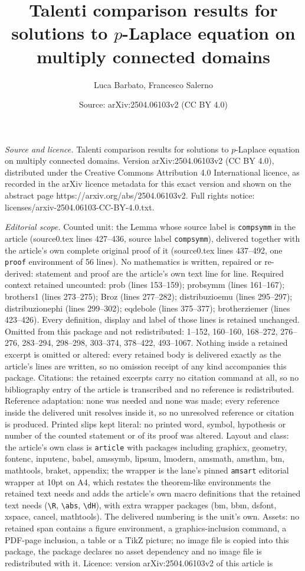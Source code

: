 \documentclass[10pt,a4paper]{amsart}
\title[Talenti comparison results for solutions to $p$-Laplace equa]{Talenti comparison results for solutions to $p$-Laplace equation on multiply connected domains}
\author{Luca Barbato, Francesco Salerno}
\date{Source: arXiv:2504.06103v2 (CC BY 4.0)}
\begin{document}
\maketitle

\noindent\emph{Source and licence.} Talenti comparison results for solutions to $p$-Laplace equation on multiply connected domains. Version arXiv:2504.06103v2 (CC BY 4.0), distributed under the Creative Commons Attribution 4.0 International licence, as recorded in the arXiv licence metadata for this exact version and shown on the abstract page https://arxiv.org/abs/2504.06103v2. Full rights notice: licenses/arxiv-2504.06103-CC-BY-4.0.txt.\par\smallskip

\noindent\textit{Editorial scope.} Counted unit: the Lemma whose source label is \texttt{compsymm} in the article (source0.tex lines 427--436, source label \texttt{compsymm}), delivered together with the article's own complete original proof of it (source0.tex lines 437--492, one \texttt{proof} environment of 56 lines). No mathematics is written, repaired or re-derived: statement and proof are the article's own text line for line. Required context retained uncounted: prob (lines 153--159); probsymm (lines 161--167); brothers1 (lines 273--275); Broz (lines 277--282); distribuzioemu (lines 295--297); distribuzionephi (lines 299--302); eqdebole (lines 375--377); brotherziemer (lines 423--426). Every definition, display and label of those lines is retained unchanged. Omitted from this package and not redistributed: 1--152, 160--160, 168--272, 276--276, 283--294, 298--298, 303--374, 378--422, 493--1067. Nothing inside a retained excerpt is omitted or altered: every retained body is delivered exactly as the article's lines are written, so no omission receipt of any kind accompanies this package. Citations: the retained excerpts carry no citation command at all, so no bibliography entry of the article is transcribed and no reference is redistributed. Reference adaptation: none was needed and none was made; every reference inside the delivered unit resolves inside it, so no unresolved reference or citation is produced. Printed slips kept literal: no printed word, symbol, hypothesis or number of the counted statement or of its proof was altered. Layout and class: the article's own class is \texttt{article} with packages including graphicx, geometry, fontenc, inputenc, babel, amssymb, lipsum, lmodern, amsmath, amsthm, bm, mathtools, braket, appendix; the wrapper is the lane's pinned \texttt{amsart} editorial wrapper at 10pt on A4, which restates the theorem-like environments the retained text needs and adds the article's own macro definitions that the retained text needs (\texttt{\textbackslash R}, \texttt{\textbackslash abs}, \texttt{\textbackslash dH}), with extra wrapper packages (bm, bbm, dsfont, xspace, cancel, mathtools). The delivered numbering is the unit's own. Assets: no retained span contains a figure environment, a graphics-inclusion command, a PDF-page inclusion, a table or a TikZ picture; no image file is copied into this package, the package declares no asset dependency and no image file is redistributed with it. Licence: version arXiv:2504.06103v2 of this article is 
\end{document}
